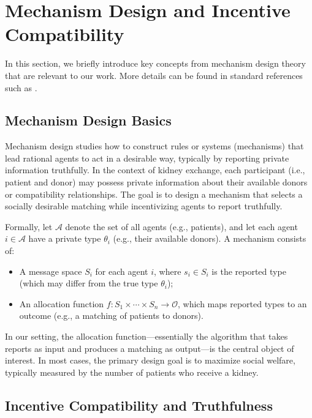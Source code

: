 \section{Mechanism Design and Incentive Compatibility}

In this section, we briefly introduce key concepts from mechanism design theory that are relevant to our work. More details can be found in standard references such as \cite{Roughgarden_2016}.





\subsection*{Mechanism Design Basics}

Mechanism design studies how to construct rules or systems (mechanisms) that lead rational agents to act in a desirable way, typically by reporting private information truthfully. In the context of kidney exchange, each participant (i.e., patient and donor) may possess private information about their available donors or compatibility relationships. The goal is to design a mechanism that selects a socially desirable matching while incentivizing agents to report truthfully.

Formally, let $\mathcal{A}$ denote the set of all agents (e.g., patients), and let each agent $i \in \mathcal{A}$ have a private type $\theta_i$ (e.g., their available donors). A mechanism consists of:
\begin{itemize}
    \item A message space $S_i$ for each agent $i$, where $s_i \in S_i$ is the reported type (which may differ from the true type $\theta_i$);
    \item An allocation function $f : S_1 \times \cdots \times S_n \rightarrow \mathcal{O}$, which maps reported types to an outcome (e.g., a matching of patients to donors).
\end{itemize}

In our setting, the allocation function—essentially the algorithm that takes reports as input and produces a matching as output—is the central object of interest. In most cases, the primary design goal is to maximize social welfare, typically measured by the number of patients who receive a kidney.

\subsection*{Incentive Compatibility and Truthfulness}

